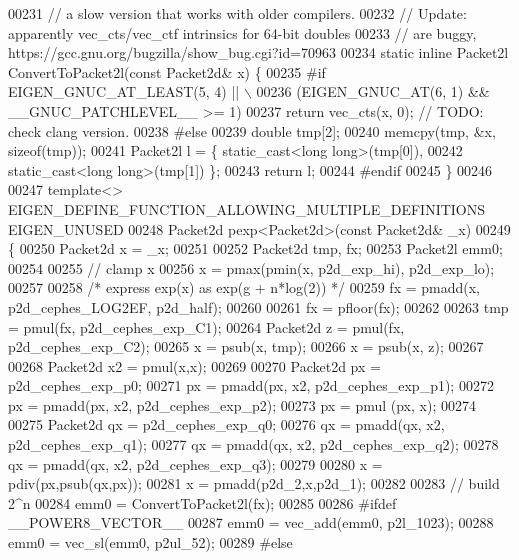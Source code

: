 \begin{DoxyCode}
00231 \textcolor{comment}{// a slow version that works with older compilers. }
00232 \textcolor{comment}{// Update: apparently vec\_cts/vec\_ctf intrinsics for 64-bit doubles}
00233 \textcolor{comment}{// are buggy, https://gcc.gnu.org/bugzilla/show\_bug.cgi?id=70963}
00234 \textcolor{keyword}{static} \textcolor{keyword}{inline} Packet2l ConvertToPacket2l(\textcolor{keyword}{const} Packet2d& x) \{
00235 \textcolor{preprocessor}{#if EIGEN\_GNUC\_AT\_LEAST(5, 4) || \(\backslash\)}
00236 \textcolor{preprocessor}{    (EIGEN\_GNUC\_AT(6, 1) && \_\_GNUC\_PATCHLEVEL\_\_ >= 1)}
00237   \textcolor{keywordflow}{return} vec\_cts(x, 0);    \textcolor{comment}{// TODO: check clang version.}
00238 \textcolor{preprocessor}{#else}
00239   \textcolor{keywordtype}{double} tmp[2];
00240   memcpy(tmp, &x, \textcolor{keyword}{sizeof}(tmp));
00241   Packet2l l = \{ \textcolor{keyword}{static\_cast<}\textcolor{keywordtype}{long} \textcolor{keywordtype}{long}\textcolor{keyword}{>}(tmp[0]),
00242                  static\_cast<long long>(tmp[1]) \};
00243   \textcolor{keywordflow}{return} l;
00244 \textcolor{preprocessor}{#endif}
00245 \}
00246 
00247 \textcolor{keyword}{template}<> EIGEN\_DEFINE\_FUNCTION\_ALLOWING\_MULTIPLE\_DEFINITIONS EIGEN\_UNUSED
00248 Packet2d pexp<Packet2d>(\textcolor{keyword}{const} Packet2d& \_x)
00249 \{
00250   Packet2d x = \_x;
00251 
00252   Packet2d tmp, fx;
00253   Packet2l emm0;
00254 
00255   \textcolor{comment}{// clamp x}
00256   x = pmax(pmin(x, p2d\_exp\_hi), p2d\_exp\_lo);
00257 
00258   \textcolor{comment}{/* express exp(x) as exp(g + n*log(2)) */}
00259   fx = pmadd(x, p2d\_cephes\_LOG2EF, p2d\_half);
00260 
00261   fx = pfloor(fx);
00262 
00263   tmp = pmul(fx, p2d\_cephes\_exp\_C1);
00264   Packet2d z = pmul(fx, p2d\_cephes\_exp\_C2);
00265   x = psub(x, tmp);
00266   x = psub(x, z);
00267 
00268   Packet2d x2 = pmul(x,x);
00269 
00270   Packet2d px = p2d\_cephes\_exp\_p0;
00271   px = pmadd(px, x2, p2d\_cephes\_exp\_p1);
00272   px = pmadd(px, x2, p2d\_cephes\_exp\_p2);
00273   px = pmul (px, x);
00274 
00275   Packet2d qx = p2d\_cephes\_exp\_q0;
00276   qx = pmadd(qx, x2, p2d\_cephes\_exp\_q1);
00277   qx = pmadd(qx, x2, p2d\_cephes\_exp\_q2);
00278   qx = pmadd(qx, x2, p2d\_cephes\_exp\_q3);
00279 
00280   x = pdiv(px,psub(qx,px));
00281   x = pmadd(p2d\_2,x,p2d\_1);
00282 
00283   \textcolor{comment}{// build 2^n}
00284   emm0 = ConvertToPacket2l(fx);
00285 
00286 \textcolor{preprocessor}{#ifdef \_\_POWER8\_VECTOR\_\_ }
00287   emm0 = vec\_add(emm0, p2l\_1023);
00288   emm0 = vec\_sl(emm0, p2ul\_52);
00289 \textcolor{preprocessor}{#else}

\end{DoxyCode}
